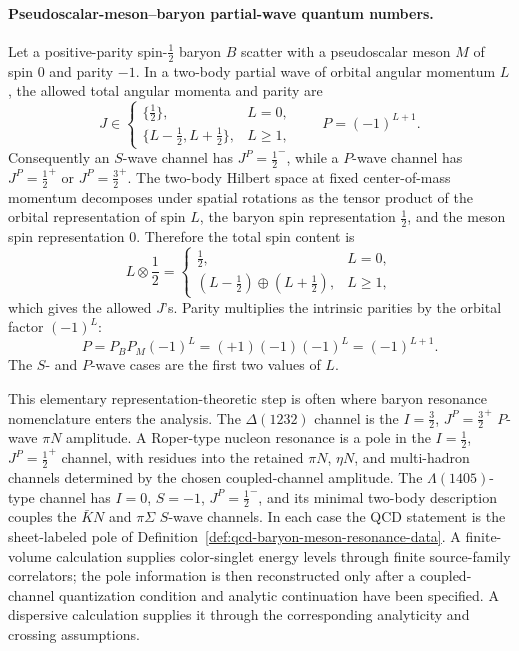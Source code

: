 \paragraph{Pseudoscalar-meson--baryon partial-wave quantum numbers.}
Let a positive-parity spin-\(\frac12\) baryon \(B\) scatter with a
pseudoscalar meson \(M\) of spin \(0\) and parity \(-1\).  In a two-body
partial wave of orbital angular momentum \(L\), the allowed total angular
momenta and parity are
\begin{equation}
  J\in
  \begin{cases}
    \{\frac12\},&L=0,\\
    \{L-\frac12,L+\frac12\},&L\ge1,
  \end{cases}
  \qquad
  P=(-1)^{L+1}.
  \label{eq:qcd-pseudoscalar-baryon-jp-rule}
\end{equation}
Consequently an \(S\)-wave channel has \(J^P=\frac12^-\), while a
\(P\)-wave channel has \(J^P=\frac12^+\) or \(J^P=\frac32^+\).
The two-body Hilbert space at fixed center-of-mass momentum decomposes under
spatial rotations as the tensor product of the orbital representation of spin
\(L\), the baryon spin representation \(\frac12\), and the meson spin
representation \(0\).  Therefore the total spin content is
\[
  L\otimes\frac12
  =
  \begin{cases}
    \frac12,&L=0,\\
    (L-\frac12)\oplus(L+\frac12),&L\ge1,
  \end{cases}
\]
which gives the allowed \(J\)'s.  Parity multiplies the intrinsic parities by
the orbital factor \((-1)^L\):
\[
  P=P_B P_M(-1)^L=(+1)(-1)(-1)^L=(-1)^{L+1}.
\]
The \(S\)- and \(P\)-wave cases are the first two values of \(L\).

This elementary representation-theoretic step is often where baryon
resonance nomenclature enters the analysis.  The \(\Delta(1232)\) channel is
the \(I=\frac32\), \(J^P=\frac32^+\) \(P\)-wave \(\pi N\) amplitude.  A
Roper-type nucleon resonance is a pole in the \(I=\frac12\),
\(J^P=\frac12^+\) channel, with residues into the retained \(\pi N\),
\(\eta N\), and multi-hadron channels determined by the chosen coupled-channel
amplitude.  The \(\Lambda(1405)\)-type channel has \(I=0\), \(S=-1\),
\(J^P=\frac12^-\), and its minimal two-body description couples the
\(\bar K N\) and \(\pi\Sigma\) \(S\)-wave channels.  In each case the QCD
statement is the sheet-labeled pole of
Definition~\ref{def:qcd-baryon-meson-resonance-data}.  A finite-volume
calculation supplies color-singlet energy levels through finite source-family
correlators; the pole information is then reconstructed only after a
coupled-channel quantization condition and analytic continuation have been
specified.  A dispersive
calculation supplies it through the corresponding analyticity and crossing
assumptions.

